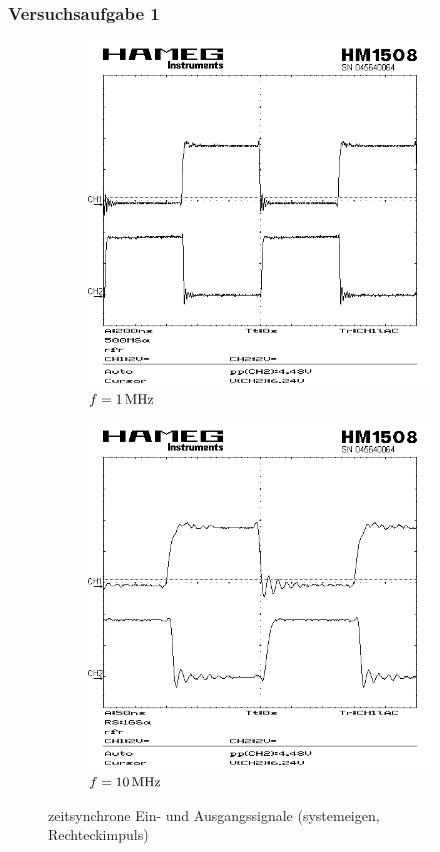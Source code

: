 \documentclass[numbers=noenddot,12pt,a4paper]{scrartcl}
\begin{document}
\subsubsection{Versuchsaufgabe 1}
\begin{figure}[H]
\begin{subfigure}[b]{0.48\textwidth}
\includegraphics[width=\textwidth]{scr16.png}
\caption{$f=\unit[1]{MHz}$}
\end{subfigure}
\begin{subfigure}[b]{0.48\textwidth}
\includegraphics[width=\textwidth]{scr17.png}
\caption{$f=\unit[10]{MHz}$}
\end{subfigure}
\caption{zeitsynchrone Ein- und Ausgangssignale (systemeigen, Rechteckimpuls)}
\end{figure}
\end{document}

